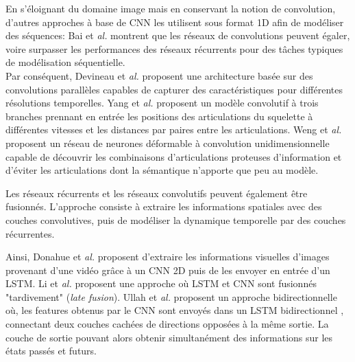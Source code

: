 En s'éloignant du domaine image mais en conservant la notion de convolution, d'autres approches à base de CNN les utilisent sous format 1D afin de modéliser des séquences:
Bai et\textit{ al.} \cite{bai2018empirical} montrent que les réseaux de convolutions peuvent égaler, voire surpasser les performances des réseaux récurrents pour des tâches typiques de modélisation séquentielle.\\

Par conséquent, Devineau et\textit{ al.} \cite{devineau2018deep} proposent une architecture basée sur des convolutions parallèles capables de capturer des caractéristiques pour différentes résolutions temporelles.
Yang et\textit{ al.} \cite{2019arXiv190709658Y} proposent un modèle convolutif à trois branches prennant en entrée les positions des articulations du squelette à différentes vitesses et les distances par paires entre les articulations.
Weng et\textit{ al.} \cite{weng2018deformable} proposent un réseau de neurones déformable à convolution unidimensionnelle capable de découvrir les combinaisons d'articulations proteuses d'information et d'éviter les articulations dont la sémantique n'apporte que peu au modèle.



Les réseaux récurrents et les réseaux convolutifs peuvent également être fusionnés. L'approche consiste à extraire les informations spatiales avec des couches convolutives, puis de modéliser la dynamique temporelle par des couches récurrentes.

Ainsi, Donahue et\textit{ al.} \cite{donahue2015long} proposent d'extraire les informations visuelles d'images provenant d'une vidéo grâce à un CNN 2D puis de les envoyer en entrée d'un LSTM.
Li et\textit{ al.} \cite{li2017skeleton} proposent une approche où LSTM et CNN sont fusionnés "tardivement" (\textit{late fusion}). Ullah et\textit{ al.} \cite{ullah2017action} proposent un approche bidirectionnelle où, les features obtenus par le CNN sont envoyés dans un LSTM bidirectionnel \cite{Schuster97bidirectionalrecurrent}, connectant deux couches cachées de directions opposées à la même sortie. La couche de sortie pouvant alors obtenir simultanément des informations sur les états passés et futurs.

